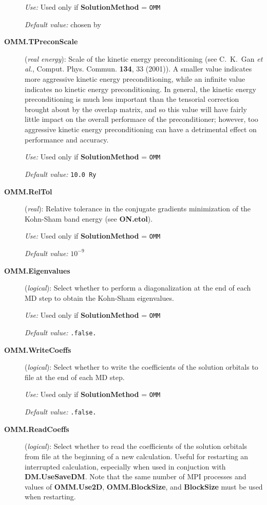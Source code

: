 \begin{description}
\textit{Use:} Used only if \textbf{SolutionMethod} = \texttt{OMM}

\textit{Default value:} chosen by \siesta\

\item[\textbf{OMM.TPreconScale}] (\textit{real energy}):
Scale of the kinetic energy preconditioning (see C.~K.~Gan {\em et al.}, Comput. Phys. Commun.
\textbf{134}, 33 (2001)). A smaller value indicates more aggressive kinetic energy preconditioning,
while an infinite value indicates no kinetic energy preconditioning. In general, the kinetic
energy preconditioning is much less important than the tensorial correction brought about by
the overlap matrix, and so this value will have fairly little impact on the overall performace
of the preconditioner; however, too aggressive kinetic energy preconditioning can have a
detrimental effect on performance and accuracy.

\textit{Use:} Used only if \textbf{SolutionMethod} = \texttt{OMM}

\textit{Default value:} \texttt{10.0 Ry}

\item[\textbf{OMM.RelTol}] (\textit{real}):
Relative tolerance in the conjugate gradients minimization of the Kohn-Sham band energy (see
\textbf{ON.etol}).

\textit{Use:} Used only if \textbf{SolutionMethod} = \texttt{OMM}

\textit{Default value:} $10^{-9}$

\item[\textbf{OMM.Eigenvalues}] (\textit{logical}):
Select whether to perform a diagonalization at the end of each MD step to obtain the Kohn-Sham
eigenvalues.

\textit{Use:} Used only if \textbf{SolutionMethod} = \texttt{OMM}

\textit{Default value:} \texttt{.false.}

\item[\textbf{OMM.WriteCoeffs}] (\textit{logical}):
Select whether to write the coefficients of the solution orbitals to file at the end of each MD
step.

\textit{Use:} Used only if \textbf{SolutionMethod} = \texttt{OMM}

\textit{Default value:} \texttt{.false.}

\item[\textbf{OMM.ReadCoeffs}] (\textit{logical}):
Select whether to read the coefficients of the solution orbitals from file at the beginning of
a new calculation. Useful for restarting an interrupted calculation, especially when used in
conjuction with \textbf{DM.UseSaveDM}. Note that the same number of MPI processes and values of
\textbf{OMM.Use2D}, \textbf{OMM.BlockSize}, and \textbf{BlockSize} must be used when restarting.


\end{description}

